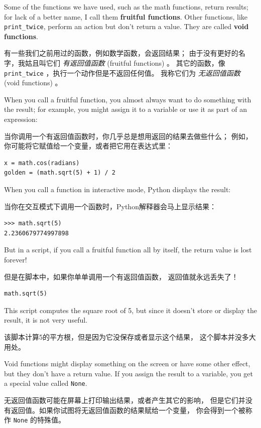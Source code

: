 Some of the functions we have used, such as the math functions, return
results; for lack of a better name, I call them {\bf fruitful
  functions}.  Other functions, like \verb"print_twice", perform an
action but don't return a value.  They are called {\bf void
  functions}.

有一些我们之前用过的函数，例如数学函数，会返回结果；
由于没有更好的名字，我姑且叫它们 \emph{有返回值函数} (fruitful functions) 。
其它的函数，像 \lstinline{print_twice} ，执行一个动作但是不返回任何值。
我称它们为 \emph{无返回值函数} (void functions) 。

When you call a fruitful function, you almost always
want to do something with the result; for example, you might
assign it to a variable or use it as part of an expression:

当你调用一个有返回值函数时，你几乎总是想用返回的结果去做些什么；
例如，你可能将它赋值给一个变量，或者把它用在表达式里：

\begin{lstlisting}
x = math.cos(radians)
golden = (math.sqrt(5) + 1) / 2
\end{lstlisting}
%
When you call a function in interactive mode, Python displays
the result:

当你在交互模式下调用一个函数时，Python解释器会马上显示结果：

\begin{lstlisting}
>>> math.sqrt(5)
2.2360679774997898
\end{lstlisting}
%
But in a script, if you call a fruitful function all by itself,
the return value is lost forever!

但是在脚本中，如果你单单调用一个有返回值函数， 返回值就永远丢失了！

\begin{lstlisting}
math.sqrt(5)
\end{lstlisting}
%
This script computes the square root of 5, but since it doesn't store
or display the result, it is not very useful.

该脚本计算5的平方根，但是因为它没保存或者显示这个结果，
这个脚本并没多大用处。

Void functions might display something on the screen or have some
other effect, but they don't have a return value.  If you
assign the result to a variable, you get a special value called
{\tt None}.

无返回值函数可能在屏幕上打印输出结果，或者产生其它的影响，
但是它们并没有返回值。如果你试图将无返回值函数的结果赋给一个变量，
你会得到一个被称作 \lstinline{None} 的特殊值。
  

